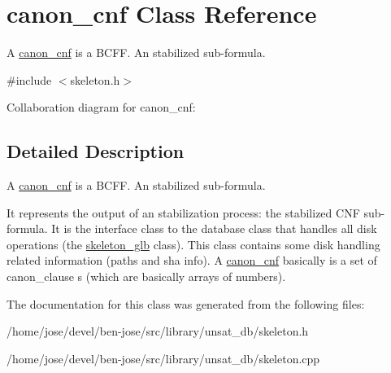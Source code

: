 \hypertarget{classcanon__cnf}{}\section{canon\+\_\+cnf Class Reference}
\label{classcanon__cnf}


A \hyperlink{classcanon__cnf}{canon\+\_\+cnf} is a B\+C\+FF. An stabilized sub-\/formula.  




{\ttfamily \#include $<$skeleton.\+h$>$}



Collaboration diagram for canon\+\_\+cnf\+:


\subsection{Detailed Description}
A \hyperlink{classcanon__cnf}{canon\+\_\+cnf} is a B\+C\+FF. An stabilized sub-\/formula. 

It represents the output of an stabilization process\+: the stabilized C\+NF sub-\/formula. It is the interface class to the database class that handles all disk operations (the \hyperlink{classskeleton__glb}{skeleton\+\_\+glb} class). This class contains some disk handling related information (paths and sha info). A \hyperlink{classcanon__cnf}{canon\+\_\+cnf} basically is a set of canon\+\_\+clause s (which are basically arrays of numbers). 

The documentation for this class was generated from the following files\+:\begin{DoxyCompactItemize}
\item 
/home/jose/devel/ben-\/jose/src/library/unsat\+\_\+db/skeleton.\+h\item 
/home/jose/devel/ben-\/jose/src/library/unsat\+\_\+db/skeleton.\+cpp\end{DoxyCompactItemize}
